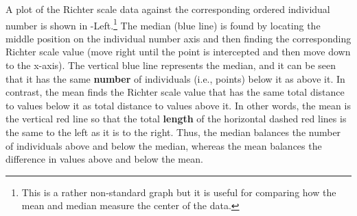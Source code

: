 \documentclass[10pt,openany]{book}\usepackage[]{graphicx}\usepackage[]{color}
\begin{document}

A plot of the Richter scale data against the corresponding ordered individual number is shown in -Left.\footnote{This is a rather non-standard graph but it is useful for comparing how the mean and median measure the center of the data.}  The median (blue line) is found by locating the middle position on the individual number axis and then finding the corresponding Richter scale value (move right until the point is intercepted and then move down to the x-axis).  The vertical blue line represents the median, and it can be seen that it has the same \textbf{number} of individuals (i.e., points) below it as above it.  In contrast, the mean finds the Richter scale value that has the same total distance to values below it as total distance to values above it.  In other words, the mean is the vertical red line so that the total \textbf{length} of the horizontal dashed red lines is the same to the left as it is to the right.  Thus, the median balances the number of individuals above and below the median, whereas the mean balances the difference in values above and below the mean.
\end{document}
